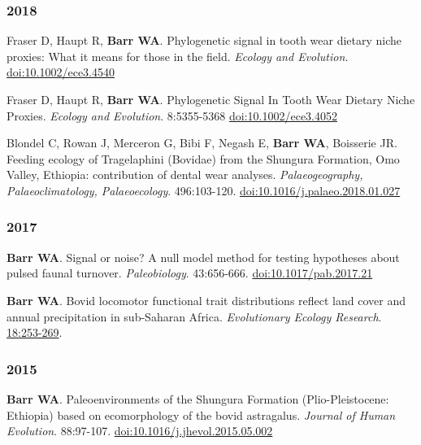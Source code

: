 \begin{etaremune}
\subsubsection*{2018}

\item Fraser D, Haupt R,  {\bfseries Barr WA}. Phylogenetic signal in tooth wear dietary niche proxies: What it means for those in the field. \emph{Ecology and Evolution.} \href{https://dx.doi.org/10.1002/ece3.4540}{doi:10.1002/ece3.4540}


\item  Fraser D, Haupt R,  {\bfseries Barr WA}. Phylogenetic Signal In Tooth Wear Dietary Niche Proxies. \emph{Ecology and Evolution}. 8:5355-5368 \href{https://doi.org/10.1002/ece3.4052}{doi:10.1002/ece3.4052}

\item  Blondel C, Rowan J, Merceron G, Bibi F,  Negash E, {\bfseries Barr WA}, Boisserie JR. Feeding ecology of Tragelaphini (Bovidae) from the Shungura Formation, Omo Valley, Ethiopia: contribution of dental wear analyses.  \emph{Palaeogeography, Palaeoclimatology, Palaeoecology}. 496:103-120. \href{https://doi.org/10.1016/j.palaeo.2018.01.027}{doi:10.1016/j.palaeo.2018.01.027}

\subsubsection*{2017}

\item  {\bfseries Barr WA}. Signal or noise? A null model method for testing hypotheses about pulsed faunal turnover. \emph{Paleobiology}. 43:656-666. \href{https://doi.org/10.1017/pab.2017.21}{doi:10.1017/pab.2017.21}

\item  {\bfseries Barr WA}. Bovid locomotor functional trait distributions reflect land cover and annual precipitation in sub-Saharan Africa. \emph{Evolutionary Ecology Research}.  \href{http://www.evolutionary-ecology.com/issues/v18/n03/ddar3051.pdf}{18:253-269}.

\subsubsection*{2015}

\item  {\bfseries Barr WA}. Paleoenvironments of the Shungura Formation (Plio-Pleistocene: Ethiopia) based on ecomorphology of the bovid astragalus. \emph{Journal of Human Evolution}. 88:97-107. \href{http://dx.doi.org/10.1016/j.jhevol.2015.05.002}{doi:10.1016/j.jhevol.2015.05.002}


\end{etaremune}
